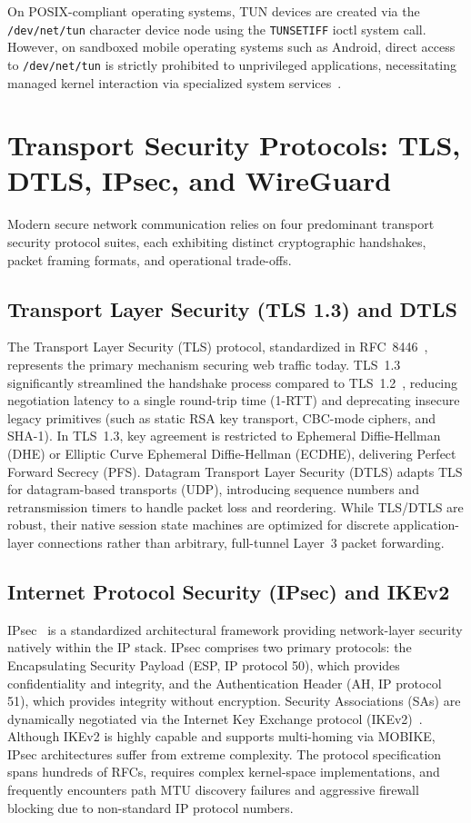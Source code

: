On POSIX-compliant operating systems, TUN devices are created via the \texttt{/dev/net/tun} character device node using the \texttt{TUNSETIFF} ioctl system call. However, on sandboxed mobile operating systems such as Android, direct access to \texttt{/dev/net/tun} is strictly prohibited to unprivileged applications, necessitating managed kernel interaction via specialized system services~\cite{ikram2016measuring}.

\section{Transport Security Protocols: TLS, DTLS, IPsec, and WireGuard}
\label{sec:transport_security_protocols}

Modern secure network communication relies on four predominant transport security protocol suites, each exhibiting distinct cryptographic handshakes, packet framing formats, and operational trade-offs.

\subsection{Transport Layer Security (TLS 1.3) and DTLS}
The Transport Layer Security (TLS) protocol, standardized in RFC~8446~\cite{rfc8446}, represents the primary mechanism securing web traffic today. TLS~1.3 significantly streamlined the handshake process compared to TLS~1.2~\cite{rfc5246}, reducing negotiation latency to a single round-trip time (1-RTT) and deprecating insecure legacy primitives (such as static RSA key transport, CBC-mode ciphers, and SHA-1). In TLS~1.3, key agreement is restricted to Ephemeral Diffie-Hellman (DHE) or Elliptic Curve Ephemeral Diffie-Hellman (ECDHE), delivering Perfect Forward Secrecy (PFS). Datagram Transport Layer Security (DTLS) adapts TLS for datagram-based transports (UDP), introducing sequence numbers and retransmission timers to handle packet loss and reordering. While TLS/DTLS are robust, their native session state machines are optimized for discrete application-layer connections rather than arbitrary, full-tunnel Layer~3 packet forwarding.

\subsection{Internet Protocol Security (IPsec) and IKEv2}
IPsec~\cite{rfc4301} is a standardized architectural framework providing network-layer security natively within the IP stack. IPsec comprises two primary protocols: the Encapsulating Security Payload (ESP, IP protocol 50), which provides confidentiality and integrity, and the Authentication Header (AH, IP protocol 51), which provides integrity without encryption. Security Associations (SAs) are dynamically negotiated via the Internet Key Exchange protocol (IKEv2)~\cite{rfc7296}. Although IKEv2 is highly capable and supports multi-homing via MOBIKE, IPsec architectures suffer from extreme complexity. The protocol specification spans hundreds of RFCs, requires complex kernel-space implementations, and frequently encounters path MTU discovery failures and aggressive firewall blocking due to non-standard IP protocol numbers.

